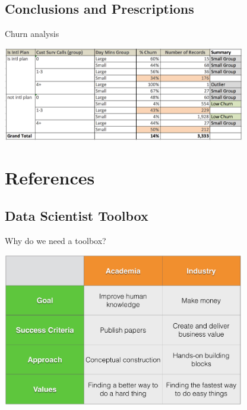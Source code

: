 \documentclass[10pt]{beamer}
\begin{document}
  \subsection{Conclusions and Prescriptions}

    \begin{frame}{Churn analysis}
      \begin{center}
        \includegraphics[width=300pt]{graphs/churn_analysis}
      \end{center}
    \end{frame}

\section{References}

  \subsection{Data Scientist Toolbox}

    \begin{frame}{Why do we need a toolbox?}
      \begin{center}
        \includegraphics[width=300pt]{graphs/academia_industry}
      \end{center}
    \end{frame}
\end{document}
